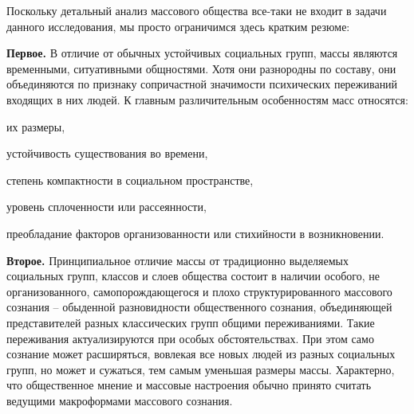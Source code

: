 Поскольку детальный анализ массового общества все-таки не входит в задачи данного исследования,
мы просто ограничимся здесь кратким резюме:

\textbf{Первое.} В отличие от обычных устойчивых социальных групп, массы являются временными,
  ситуативными общностями. Хотя они разнородны по составу, они объединяются по признаку сопричастной
  значимости психических переживаний входящих в них людей. К главным различительным особенностям масс
  относятся:
  \begin{enumerate*}[label=\asbuk*)]
  \item их размеры,
  \item устойчивость существования во времени,
  \item степень компактности в социальном пространстве,
  \item уровень сплоченности или рассеянности,
  \item преобладание факторов организованности или стихийности в возникновении.
  \end{enumerate*}

\textbf{Второе.} Принципиальное отличие массы от традиционно выделяемых социальных групп,
  классов и слоев общества состоит в наличии особого, не организованного, самопорождающегося и
  плохо структурированного массового сознания -- обыденной разновидности общественного сознания,
  объединяющей представителей разных классических групп общими переживаниями. Такие переживания
  актуализируются при особых обстоятельствах. При этом само сознание может расширяться, вовлекая
  все новых людей из разных социальных групп, но может и сужаться, тем самым уменьшая размеры массы.
  Характерно, что общественное мнение и массовые настроения обычно принято считать ведущими макроформами
  массового сознания.

